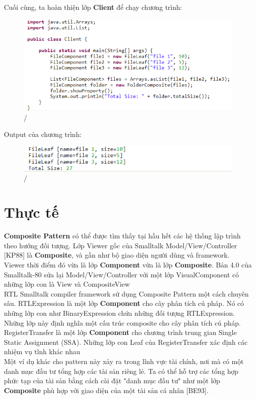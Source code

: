 Cuối cùng, ta hoàn thiện lớp \textbf{Client} để chạy chương trình:
\begin{figure}[!htb]
    \centering
    \includegraphics[width=\textwidth]{fig/Composite/FileClient.png}/
\end{figure}\newpage

Output của chương trình:
\begin{figure}[!htb]
    \centering
    \includegraphics[width=\textwidth]{fig/Composite/FileOutput.png}/
\end{figure}

\section{Thực tế}
\textbf{Composite Pattern} có thể được tìm thấy tại hầu hết các hệ thống lập trình theo hướng đối tượng. Lớp Viewer gốc của Smalltalk Model/View/Controller [KP88] là \textbf{Composite}, và gần như bộ giao diện người dùng và framework. Viewer thời điểm đó vừa là lớp \textbf{Component} vừa là lớp \textbf{Composite}. Bản 4.0 của Smalltalk-80 sửa lại Model/View/Controller với một lớp VisualComponent có những lớp con là View và CompositeView\\[0.1in]
RTL Smalltalk compiler framework sử dụng Composite Pattern một cách chuyên sâu. RTLExpression là một lớp \textbf{Component} cho cây phân tích cú pháp. Nó có những lớp con như BinaryExpression chứa những đối tượng RTLExpression. Những lớp này định nghĩa một cấu trúc composite cho cây phân tích cú pháp. RegisterTransfer là một lớp \textbf{Component} cho chương trình trung gian Single Static Assignment (SSA). Những lớp con Leaf của RegisterTransfer xác định các nhiệm vụ tĩnh khác nhau\\[0.1in]
Một ví dụ khác cho pattern này xảy ra trong lĩnh vực tài chính, nơi mà có một danh mục đầu tư tổng hợp các tài sản riêng lẻ. 
Ta có thể hỗ trợ các tổng hợp phức tạp của tài sản bằng cách cài đặt "danh mục đầu tư" như một lớp \textbf{Composite} phù hợp với giao diện của một tài sản cá nhân [BE93].